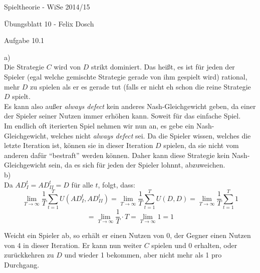 \documentclass{scrartcl}
\begin{document}
\begin{LARGE}
Spieltheorie - WiSe 2014/15
\end{LARGE}

\begin{Large}
Übungsblatt 10 - Felix Dosch\\[1.0cm]
\end{Large}

\begin{Large}
Aufgabe 10.1\\[0.0cm]
\end{Large}

a) \\

Die Strategie $C$ wird von $D$ strikt dominiert. Das heißt, es ist für jeden der Spieler (egal
welche gemischte Strategie gerade von ihm gespielt wird) rational, mehr $D$ zu spielen als er es gerade
tut (falls er nicht eh schon die reine Strategie $D$ spielt. \\

Es kann also außer \textsl{always defect} kein anderes Nash-Gleichgewicht geben, da einer der
Spieler seiner Nutzen immer erhöhen kann. Soweit für das einfache Spiel. \\

Im endlich oft iterierten Spiel nehmen wir nun an, es gebe ein Nash-Gleichgewicht, welches nicht
\textsl{always defect} sei. Da die Spieler wissen, welches die letzte Iteration ist, können sie
in dieser Iteration $D$ spielen, da sie nicht vom anderen dafür "`bestraft"' werden können. Daher
kann diese Strategie kein Nash-Gleichgewicht sein, da es sich für jeden der Spieler lohnnt,
abzuweichen. \\

b) \\

Da $AD^t_I = AD^t_{II} = D$ für alle $t$, folgt, dass: \\

\[
\lim_{T \to \infty} \frac{1}{T} \sum_{t=1}^{T} U(AD^t_I, AD^t_{II}) = \lim_{T \to \infty}
\frac{1}{T} \sum_{t=1}^{T} U(D, D) = \lim_{T \to \infty} \frac{1}{T} \sum_{t=1}^{T} 1
\]
\[
= \lim_{T \to \infty} \frac{1}{T} \cdot T = \lim_{T \to \infty} 1 = 1
\]

Weicht ein Spieler ab, so erhält er einen Nutzen von 0, der Gegner einen Nutzen von 4 in dieser
Iteration. Er kann nun weiter $C$ spielen und 0 erhalten, oder zurückkehren zu $D$ und wieder 1
bekommen, aber nicht mehr als 1 pro Durchgang. \\
\end{document}
